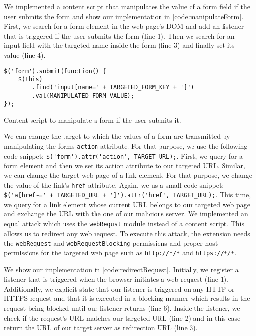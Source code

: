 	We implemented a content script that manipulates the value of a form field if the user submits the form and show our implementation in \autoref{code:manipulateForm}. First, we search for a form element in the web page's DOM and add an listener that is triggered if the user submits the form (line 1). Then we search for an input field with the targeted name inside the form (line 3) and finally set its value (line 4).

	\begin{code}
		\begin{lstlisting}
$('form').submit(function() {
	$(this)
		.find('input[name=' + TARGETED_FORM_KEY + ']')
		.val(MANIPULATED_FORM_VALUE);
});
\end{lstlisting}
		\caption{Content script to manipulate a form if the user submits it.}
		\label{code:manipulateForm}
	\end{code}

	We can change the target to which the values of a form are transmitted by manipulating the forms \texttt{action} attribute. For that purpose, we use the following code snippet: \lstinline|$('form').attr('action', TARGET_URL);|. First, we query for a form element and then we set its action attribute to our targeted URL. Similar, we can change the target web page of a link element. For that purpose, we change the value of the link's \texttt{href} attribute. Again, we us a small code snippet: \lstinline|$('a[href~=' + TARGETED_URL + ']').attr('href', TARGET_URL);|. This time, we query for a link element whose current URL belongs to our targeted web page and exchange the URL with the one of our malicious server. We implemented an equal attack which uses the \texttt{webRequst} module instead of a content script. This allows us to redirect any web request. To execute this attack, the extension needs the \texttt{webRequest} and \texttt{webRequestBlocking} permissions and proper host permissions for the targeted web page such as \texttt{http://*/*} and \texttt{https://*/*}. 
	
	We show our implementation in \autoref{code:redirectRequest}. Initially, we register a listener that is triggered when the browser initiates a web request (line 1). Additionally, we explicit state that our listener is triggered on any HTTP or HTTPS request and that it is executed in a blocking manner which results in the request being blocked until our listener returns (line 6). Inside the listener, we check if the request's URL matches our targeted URL (line 2) and in this case return the URL of our target server as redirection URL (line 3).
	
